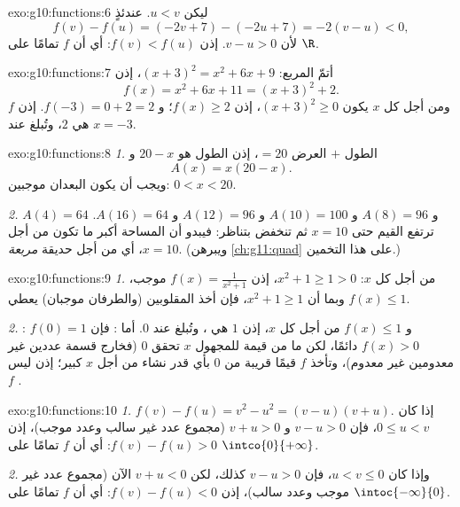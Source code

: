 \begin{solution}{exo:g10:functions:6}
ليكن $u < v$. عندئذٍ
\[
f(v) - f(u) = (-2v + 7) - (-2u + 7) = -2(v - u) < 0,
\]
لأن $v - u > 0$. إذن $f(v) < f(u)$: أي أن $f$  تمامًا على $\R$.
\end{solution}

\begin{solution}{exo:g10:functions:7}
أتمّ المربع: $(x+3)^2 = x^2 + 6x + 9$، إذن
\[
f(x) = x^2 + 6x + 11 = (x + 3)^2 + 2 .
\]
ومن أجل كل $x$ يكون $(x+3)^2 \geq 0$، إذن $f(x) \geq 2$؛ و
$f(-3) = 0 + 2 = 2$. إذن   $f$ هي $2$، وتُبلغ عند $x = -3$.
\end{solution}

\begin{solution}{exo:g10:functions:8}
\emph{1.} الطول $+$ العرض $= 20$، إذن الطول هو $20 - x$ و
\[
A(x) = x(20 - x).
\]
ويجب أن يكون البعدان موجبين: $0 < x < 20$.

\emph{2.} $A(4) = 64$ و $A(8) = 96$ و $A(10) = 100$ و $A(12) = 96$ و
$A(16) = 64$. ترتفع القيم حتى $x = 10$ ثم تنخفض بتناظر:
فيبدو أن المساحة أكبر ما تكون من أجل $x = 10$، أي من أجل حديقة \emph{مربعة}.
(ويبرهن \cref{ch:g11:quad} على هذا التخمين.)
\end{solution}

\begin{solution}{exo:g10:functions:9}
\emph{1.} من أجل كل $x$: $x^2 + 1 \geq 1 > 0$، إذن $f(x) = \frac{1}{x^2+1}$
موجب، وبما أن $x^2 + 1 \geq 1$، فإن أخذ المقلوبين (والطرفان
موجبان) يعطي $f(x) \leq 1$.

\emph{2.} : $f(0) = 1$ و $f(x) \leq 1$ من أجل كل $x$، إذن $1$ هي
، وتُبلغ عند $0$. أما : فإن $f(x) > 0$ دائمًا، لكن ما من قيمة للمجهول $x$
تحقق $0$ (فخارج قسمة عددين غير معدومين غير معدوم)، وتأخذ $f$
قيمًا قريبة من $0$ بأي قدر نشاء من أجل $x$ كبير؛ إذن ليس  $f$ .
\end{solution}

\begin{solution}{exo:g10:functions:10}
\emph{1.} $f(v) - f(u) = v^2 - u^2 = (v-u)(v+u)$. إذا كان $0 \leq u < v$، فإن
$v - u > 0$ و $v + u > 0$ (مجموع عدد غير سالب وعدد موجب)،
إذن $f(v) - f(u) > 0$: أي أن $f$  تمامًا على $\intco{0}{+\infty}$.

\emph{2.} وإذا كان $u < v \leq 0$، فإن $v - u > 0$ كذلك، لكن
$v + u < 0$ الآن (مجموع عدد غير موجب وعدد سالب)، إذن
$f(v) - f(u) < 0$: أي أن $f$  تمامًا على $\intoc{-\infty}{0}$.
\end{solution}

